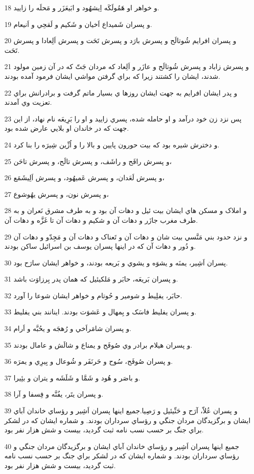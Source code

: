 \par 18 و خواهر او هَمُولَکَه اِيشهُود و ابَيعَزَر و مَحلَه را زاييد.
\par 19 و پسران شَميداع اَخيان و شَکيم و لَقحِي و اَنيعام.
\par 20 و پسران افرايم شُوتالَح و پسرش بارَد و پسرش تَحَت و پسرش اَلِعادا و پسرش تَحَت.
\par 21 و پسرش زاباد و پسرش شُوتالَح و عازَر و اَلِعاد که مردان جَتّ که در آن زمين مولود شدند، ايشان را کشتند زيرا که براي گرفتن مواشي ايشان فرمود آمده بودند.
\par 22 و پدر ايشان افرايم به جهت ايشان روزها ي بسيار ماتم گرفت و برادرانش براي تعزيت وي آمدند.
\par 23 پس نزد زن خود درآمد و او حامله شده، پسري زاييد و او را بَرِيعَه نام نهاد، از اين جهت که در خاندان او بلايي عارض شده بود.
\par 24 و دخترش شيره بود که بيت حورون پايين و بالا را و اُزِّين شِيرَه را بنا کرد.
\par 25 و پسرش رافَح و راشَف، و پسرش تالَح، و پسرش تاحَن،
\par 26 و پسرش لَعَدان، و پسرش عَميهُود، و پسرش اَلِيشَمَع،
\par 27 و پسرش نون، و پسرش يهُوشوع،
\par 28 و املاک و مسکن هاي ايشان بيت ئيل و دهات آن بود و به طرف مشرق نَعران و به طرف مغرب جازَر و دهات آن و شکيم و دهات آن تا غَزَّه و دهات آن.
\par 29 و نزد حدود بني مَنَّسي بيت شان و دهات آن و تَعناک و دهات آن و مَجِدّو و دهات آن و دُور و دهات آن که در اينها پسران يوسف بن اسرائيل ساکن بودند.
\par 30 پسران اَشِير، يمنَه و يشوَه و يشوي و بَريعه بودند، و خواهر ايشان سارَح بود.
\par 31 و پسران بَريعَه، حابَر و مَلکيئيل که همان پدر بِرزاوَت باشد.
\par 32 حابَر، يفلِيط و شومير و حُوتام و خواهر ايشان شوعا را آورد.
\par 33 و پسران يفليط فاسَک و بِمهال و عَشوَت بودند. اينانند بني يفليط.
\par 34 و پسران شامَراَخي و رُهجَه و يحُبَّه و اَرام.
\par 35 و پسران هيلام برادر وي صُوفَح و يمناع و شالَش و عامال بودند.
\par 36 و پسران صُوفَح، سُوح و حَرنَفَر و شُوعال و بِيرِي و يمرَه.
\par 37 و باصَر و هُود و شَمَّا و شَلَشَه و يتران و بئِيرا.
\par 38 و پسران يتَر، يفُنَّه و فِسفا و آرا.
\par 39 و پسران عُلاّ، آرَح و حَنِّيئيل و رَصِيا.جميع اينها پسران اَشِير و رؤساي خاندان آباي ايشان و برگزيدگان مردان جنگي و رؤساي سرداران بودند. و شماره ايشان که در لشکر براي جنگ بر حسب نسب نامه ثبت گرديد، بيست و شش هزار نفر بود.
\par 40 جميع اينها پسران اَشِير و رؤساي خاندان آباي ايشان و برگزيدگان مردان جنگي و رؤساي سرداران بودند. و شماره ايشان که در لشکر براي جنگ بر حسب نسب نامه ثبت گرديد، بيست و شش هزار نفر بود.
 
